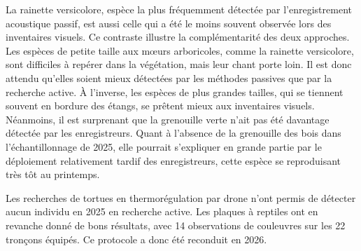 La rainette versicolore, espèce la plus fréquemment détectée par l'enregistrement acoustique passif, est aussi celle qui a été le moins souvent observée lors des inventaires visuels. Ce contraste illustre la complémentarité des deux approches. Les espèces de petite taille aux m\oe{}urs arboricoles, comme la rainette versicolore, sont difficiles à repérer dans la végétation, mais leur chant porte loin. Il est donc attendu qu'elles soient mieux détectées par les méthodes passives que par la recherche active. À l'inverse, les espèces de plus grandes tailles, qui se tiennent souvent en bordure des étangs, se prêtent mieux aux inventaires visuels. Néanmoins, il est surprenant que la grenouille verte n'ait pas été davantage détectée par les enregistreurs. Quant à l'absence de la grenouille des bois dans l'échantillonnage de 2025, elle pourrait s'expliquer en grande partie par le déploiement relativement tardif des enregistreurs, cette espèce se reproduisant très tôt au printemps.

Les recherches de tortues en thermorégulation par drone n'ont permis de détecter aucun individu en 2025 en recherche active.  Les plaques à reptiles ont en revanche donné de bons résultats, avec 14 observations de couleuvres sur les 22 tronçons équipés. Ce protocole a donc été reconduit en 2026.